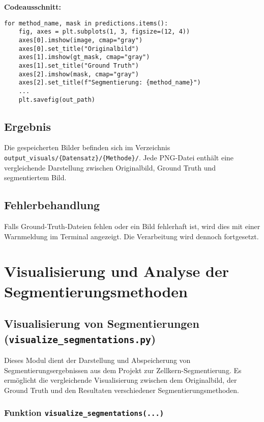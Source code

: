 \documentclass[a4paper,12pt]{article}
\begin{document}
\textbf{Codeausschnitt:}
\begin{verbatim}
for method_name, mask in predictions.items():
    fig, axes = plt.subplots(1, 3, figsize=(12, 4))
    axes[0].imshow(image, cmap="gray")
    axes[0].set_title("Originalbild")
    axes[1].imshow(gt_mask, cmap="gray")
    axes[1].set_title("Ground Truth")
    axes[2].imshow(mask, cmap="gray")
    axes[2].set_title(f"Segmentierung: {method_name}")
    ...
    plt.savefig(out_path)
\end{verbatim}

\subsection*{ Ergebnis}

Die gespeicherten Bilder befinden sich im Verzeichnis \texttt{output\_visuals/\{Datensatz\}/\{Methode\}/}. Jede PNG-Datei enthält eine vergleichende Darstellung zwischen Originalbild, Ground Truth und segmentiertem Bild.

\subsection*{ Fehlerbehandlung}

Falls Ground-Truth-Dateien fehlen oder ein Bild fehlerhaft ist, wird dies mit einer Warnmeldung im Terminal angezeigt. Die Verarbeitung wird dennoch fortgesetzt.


\section{Visualisierung und Analyse der Segmentierungsmethoden}

\subsection{Visualisierung von Segmentierungen (\texttt{visualize\_segmentations.py})}

Dieses Modul dient der Darstellung und Abspeicherung von Segmentierungsergebnissen aus dem Projekt zur Zellkern-Segmentierung. Es ermöglicht die vergleichende Visualisierung zwischen dem Originalbild, der Ground Truth und den Resultaten verschiedener Segmentierungsmethoden.

\subsubsection*{Funktion \texttt{visualize\_segmentations(...)}} 
\end{document}
